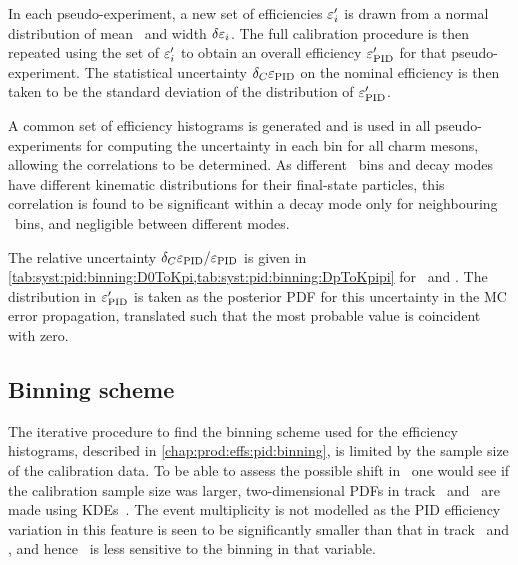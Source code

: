 In each pseudo-experiment, a new set of efficiencies $\varepsilon_{i}'$ is drawn from a 
normal distribution of mean \effi\ and width $\delta{\ensuremath{\varepsilon_{i}}}$.
The full calibration procedure is then repeated using the set of $\varepsilon_{i}'$ to 
obtain an overall efficiency $\varepsilon_{\textnormal{PID}}'$ for that pseudo-experiment.
The statistical uncertainty $\delta_{C}{\varepsilon_{\textnormal{PID}}}$ on the nominal efficiency is 
then taken to be the standard deviation of the distribution of $\varepsilon_{\textnormal{PID}}'$.

A common set of efficiency histograms is generated and is used in all 
pseudo-experiments for computing the uncertainty in each bin for all charm 
mesons, allowing the correlations to be determined.
As different \pTy\ bins and decay modes have different kinematic distributions 
for their final-state particles, this correlation is found to be significant 
within a decay mode only for neighbouring \pTy\ bins, and negligible between 
different modes.

The relative uncertainty $\delta_{C}{\varepsilon_{\textnormal{PID}}}/\varepsilon_{\textnormal{PID}}$ is given in 
\cref{tab:syst:pid:binning:D0ToKpi,tab:syst:pid:binning:DpToKpipi} for 
\DzToKpi\ and \DpToKpipi.
The distribution in $\varepsilon_{\textnormal{PID}}'$ is taken as the posterior \ac{PDF} for this 
uncertainty in the \ac{MC} error propagation, translated such that the most 
probable value is coincident with zero.

\subsection{Binning scheme}
\label{chap:prod:syst:pid:binning}

The iterative procedure to find the binning scheme used for the efficiency 
histograms, described in \cref{chap:prod:effs:pid:binning}, is limited by the 
sample size of the calibration data.
To be able to assess the possible shift in \effpid\ one would see if the 
calibration sample size was larger, two-dimensional \acp{PDF} in track \ptot\ 
and \Eta\ are made using \acp{KDE}~\cite{Poluektov:2014rxa}.
The event multiplicity is not modelled as the \ac{PID} efficiency variation in 
this feature is seen to be significantly smaller than that in track \ptot\ and 
\Eta, and hence \effpid\ is less sensitive to the binning in that variable.

